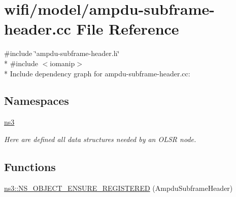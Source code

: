 \hypertarget{ampdu-subframe-header_8cc}{}\section{wifi/model/ampdu-\/subframe-\/header.cc File Reference}
\label{ampdu-subframe-header_8cc}
{\ttfamily \#include \char`\"{}ampdu-\/subframe-\/header.\+h\char`\"{}}\\*
{\ttfamily \#include $<$iomanip$>$}\\*
Include dependency graph for ampdu-\/subframe-\/header.cc\+:
\subsection*{Namespaces}
\begin{DoxyCompactItemize}
\item 
 \hyperlink{namespacens3}{ns3}
\begin{DoxyCompactList}\small\item\em Here are defined all data structures needed by an O\+L\+SR node. \end{DoxyCompactList}\end{DoxyCompactItemize}
\subsection*{Functions}
\begin{DoxyCompactItemize}
\item 
\hyperlink{namespacens3_a81ffeeb77c22035365c7e35a173ac18a}{ns3\+::\+N\+S\+\_\+\+O\+B\+J\+E\+C\+T\+\_\+\+E\+N\+S\+U\+R\+E\+\_\+\+R\+E\+G\+I\+S\+T\+E\+R\+ED} (Ampdu\+Subframe\+Header)
\end{DoxyCompactItemize}
